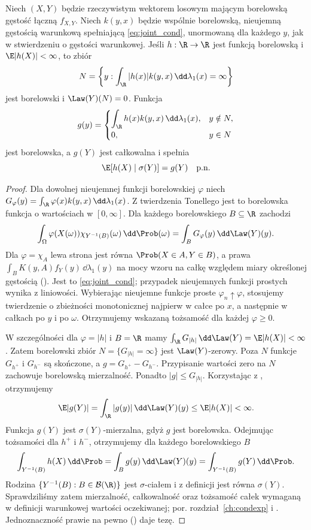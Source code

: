 \begin{twierdzenie}
Niech $(X,Y)$ będzie rzeczywistym wektorem losowym
mającym borelowską gęstość łączną $f_{X,Y}$.
Niech $k(y,x)$ będzie wspólnie borelowską, nieujemną
gęstością warunkową spełniającą \eqref{eq:joint_cond},
unormowaną dla każdego $y$, jak w stwierdzeniu o gęstości
warunkowej.
Jeśli $h:\R\to\R$ jest funkcją borelowską i
$\E|h(X)|<\infty$, to zbiór
\[
N=\left\{y:\int_\R |h(x)|k(y,x)\,\dd\lambda_1(x)=\infty\right\}
\]
jest borelowski i $\Law(Y)(N)=0$. Funkcja
\[
g(y)=
\begin{cases}
\displaystyle\int_\R h(x)k(y,x)\,\dd\lambda_1(x),&y\notin N,\\
0,&y\in N
\end{cases}
\]
jest borelowska, a $g(Y)$ jest całkowalna i spełnia
\[
\E[h(X)\mid\sigma(Y)]=g(Y)\quad\text{p.n.}
\]
\end{twierdzenie}
\begin{proof}
Dla dowolnej nieujemnej funkcji borelowskiej $\varphi$
niech $G_\varphi(y)=\int_\R \varphi(x)k(y,x)\,\dd\lambda_1(x)$.
Z twierdzenia Tonellego jest to borelowska funkcja
o wartościach w $[0,\infty]$. Dla każdego borelowskiego
$B\subseteq\R$ zachodzi
\[
\int_\Omega \varphi(X(\omega))\chi_{Y^{-1}(B)}(\omega)\,
\dd\Prob(\omega)
=\int_B G_\varphi(y)\,\dd\Law(Y)(y).
\]
Dla $\varphi=\chi_A$ lewa strona jest równa
$\Prob(X\in A,Y\in B)$, a prawa
$\int_B K(y,A)f_Y(y)\,\dd\lambda_1(y)$ na mocy
wzoru na całkę względem miary określonej gęstością
().
Jest to \eqref{eq:joint_cond}; przypadek nieujemnych
funkcji prostych wynika z liniowości.
Wybierając nieujemne funkcje proste $\varphi_n\uparrow\varphi$,
stosujemy twierdzenie o zbieżności monotonicznej najpierw
w całce po $x$, a następnie w całkach po $y$ i po $\omega$.
Otrzymujemy wskazaną tożsamość dla każdej $\varphi\geq0$.

W szczególności dla $\varphi=|h|$ i $B=\R$ mamy
$\int_\R G_{|h|}\,\dd\Law(Y)=\E|h(X)|<\infty$.
Zatem borelowski zbiór $N=\{G_{|h|}=\infty\}$ jest
$\Law(Y)$-zerowy. Poza $N$ funkcje $G_{h^+}$ i $G_{h^-}$
są skończone, a $g=G_{h^+}-G_{h^-}$. Przypisanie wartości
zero na $N$ zachowuje borelowską mierzalność.
Ponadto $|g|\leq G_{|h|}$. Korzystając z
,
otrzymujemy
\[
\E|g(Y)|=\int_\R |g(y)|\,\dd\Law(Y)(y)
\leq\E|h(X)|<\infty.
\]
Funkcja $g(Y)$ jest $\sigma(Y)$-mierzalna, gdyż $g$ jest
borelowska. Odejmując tożsamości dla $h^+$ i $h^-$,
otrzymujemy dla każdego borelowskiego $B$
\[
\int_{Y^{-1}(B)}h(X)\,\dd\Prob
=\int_B g(y)\,\dd\Law(Y)(y)
=\int_{Y^{-1}(B)}g(Y)\,\dd\Prob.
\]
Rodzina $\{Y^{-1}(B):B\in\mathcal B(\R)\}$ jest
$\sigma$-ciałem i z definicji jest równa $\sigma(Y)$.
Sprawdziliśmy zatem mierzalność, całkowalność oraz
tożsamość całek wymaganą w definicji warunkowej wartości
oczekiwanej; por. rozdział~\ref{ch:condexp} i
.
Jednoznaczność prawie na pewno
()
daje tezę.
\end{proof}
